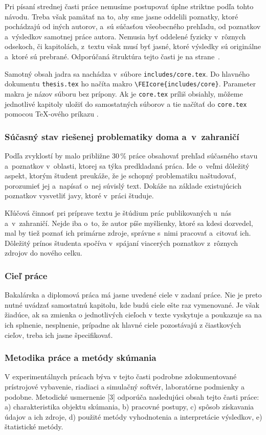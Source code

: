 Pri písaní strednej časti práce nemusíme postupovať úplne 
striktne podľa tohto návodu.
Treba však pamätať na to,
aby sme jasne oddelili poznatky,
ktoré pochádzajú od iných autorov,
a~sú súčasťou všeobecného prehľadu,
od poznatkov a~výsledkov samotnej práce autora.
Nemusia byť oddelené fyzicky v~rôznych odsekoch,
či kapitolách, z~textu však musí byť jasné,
ktoré výsledky sú originálne a~ktoré sú prebrané.
Odporúčaná štruktúra tejto časti je na 
strane~\pageref{sec:StrukturaPrace}.

Samotný obsah jadra sa nachádza v~súbore \verb|includes/core.tex|.
Do hlavného dokumentu \verb|thesis.tex| ho načíta makro \verb|\FEIcore{includes/core}|.
Parameter makra je názov súboru bez prípony.
Ak je \verb|core.tex| príliš obsiahly,
môžeme jednotlivé kapitoly uložiť do samostatných
súborov a tie načítať do \verb|core.tex|
pomocou \TeX-ového príkazu \verb||.

\subsubsection*{\normalsize Súčasný stav riešenej problematiky 
doma a~v~zahraničí}
Podľa zvyklostí by malo približne 30\,\% práce obsahovať prehľad 
súčasného stavu a~poznatkov v~oblasti,
ktorej sa týka predkladaná práca.
Ide o~veľmi dôležitý aspekt,
ktorým študent preukáže,
že je schopný problematiku naštudovať,
porozumieť jej a~napísať o~nej súvislý text.
Dokáže na základe existujúcich poznatkov vysvetliť javy,
ktoré v~práci študuje. 

Kľúčová činnosť pri príprave textu je štúdium prác publikovaných 
u~nás a~v~zahraničí.
Nejde iba o~to, že autor píše myšlienky, ktoré sa kdesi dozvedel, 
mal by tiež poznať ich primárne zdroje,
správne s~nimi pracovať a~citovať ich.
Dôležitý prínos študenta spočíva v~spájaní viacerých poznatkov
z~rôznych zdrojov do nového celku.

\subsubsection*{\normalsize Cieľ práce}
Bakalárska a diplomová práca má jasne uvedené ciele v zadaní práce. Nie je preto nutné uvádzať samostatnú kapitolu, kde budú ciele ešte raz vymenované. Je však žiadúce, ak sa zmienka o jednotlivých cieľoch v texte vyskytuje a poukazuje sa na ich splnenie, nesplnenie, prípadne ak hlavné ciele pozostávajú z čiastkových cieľov, treba ich jasne špecifikovať.

\subsubsection*{\normalsize Metodika práce a metódy skúmania}
V experimentálnych prácach býva v tejto časti podrobne zdokumentované prístrojové vybavenie, riadiaci a simulačný softvér, laboratórne podmienky a podobne. Metodické usmernenie [3] odporúča nasledujúci obsah tejto časti práce: a) charakteristika objektu skúmania, b) pracovné postupy, c) spôsob získavania údajov a ich zdroje, d) použité metódy vyhodnotenia a interpretácie výsledkov, e) štatistické metódy.

